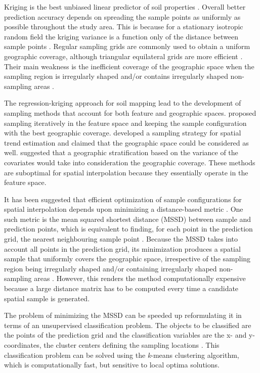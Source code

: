 Kriging is the best unbiased linear predictor of soil properties \cite{LarkEtAl2006}. Overall better prediction 
accuracy depends on spreading the sample points as uniformly as possible throughout the study area. This is 
because for a stationary isotropic random field the kriging variance is a function only of the distance between 
sample points \cite{Cressie1993}. Regular sampling grids are commonly used to obtain a uniform geographic 
coverage, although triangular equilateral grids are more efficient \cite{WebsterEtAl2007}. Their main weakness 
is the inefficient coverage of the geographic space when the sampling region is irregularly shaped and/or 
contains irregularly shaped non-sampling areas \cite{WalvoortEtAl2010}.

The regression-kriging approach for soil mapping \cite{HenglEtAl2007b} lead to the development of sampling 
methods that account for both feature and geographic spaces. \citet{HenglEtAl2003a} proposed sampling 
iteratively in the feature space and keeping the sample configuration with the best geographic coverage. 
\citet{MinasnyEtAl2006b} developed a sampling strategy for spatial trend estimation and claimed that the 
geographic space could be considered as well. \citet{MinasnyEtAl2007a} suggested that a geographic 
stratification based on the variance of the covariates would take into consideration the geographic coverage. 
These methods are suboptimal for spatial interpolation because they essentially operate in the feature space.

It has been suggested that efficient optimization of sample configurations for spatial interpolation depends 
upon minimizing a distance-based metric \cite{RoyleEtAl1998}. One such metric is the mean squared shortest 
distance (MSSD) between sample and prediction points, which is equivalent to finding, for each point in the 
prediction grid, the nearest neighbouring sample point  \cite{BrusEtAl2006}. Because the MSSD takes into 
account all points in the prediction grid, its minimization produces a spatial sample that uniformly covers the 
geographic space, irrespective of the sampling region being irregularly shaped and/or containing 
irregularly shaped non-sampling areas \cite{WalvoortEtAl2010}. However, this renders the method computationally 
expensive because a large distance matrix has to be computed every time a candidate spatial sample is 
generated.

The problem of minimizing the MSSD can be speeded up reformulating it in terms of an unsupervised 
classification problem. The objects to be classified are the points of the prediction grid and the 
classification variables are the x- and y-coordinates, the cluster centers defining the sampling locations 
\cite{WalvoortEtAl2010}. This classification problem can be solved using the \textit{k}-means clustering 
algorithm, which is computationally fast, but sensitive to local optima solutions.

